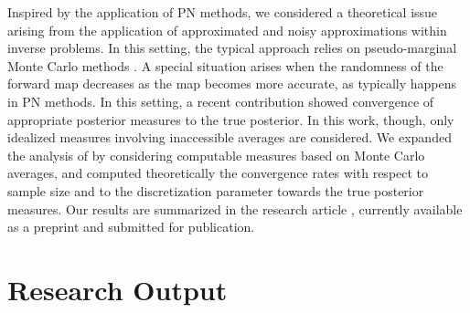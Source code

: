 \documentclass[10pt]{article}
\begin{document}
Inspired by the application of PN methods, we considered a theoretical issue arising from the application of approximated and noisy approximations within inverse problems. In this setting, the typical approach relies on pseudo-marginal Monte Carlo methods \cite{AnR09}. A special situation arises when the randomness of the forward map decreases as the map becomes more accurate, as typically happens in PN methods. In this setting, a recent contribution \cite{LST18} showed convergence of appropriate posterior measures to the true posterior. In this work, though, only idealized measures involving inaccessible averages are considered. We expanded the analysis of \cite{LST18} by considering computable measures based on Monte Carlo averages, and computed theoretically the convergence rates with respect to sample size and to the discretization parameter towards the true posterior measures. Our results are summarized in the research article \cite{Gar21b}, currently available as a preprint and submitted for publication.

\section{Research Output}
\end{document}
